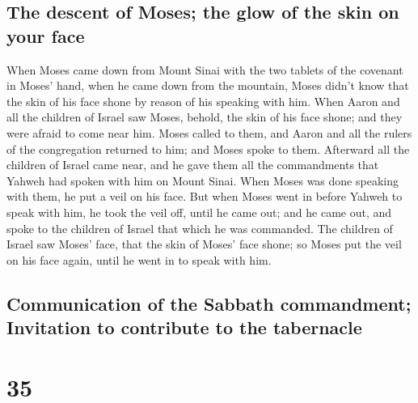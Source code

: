 \hypertarget{the-descent-of-moses-the-glow-of-the-skin-on-your-face}{%
\subsection{The descent of Moses; the glow of the skin on your
face}\label{the-descent-of-moses-the-glow-of-the-skin-on-your-face}}

 When Moses came down from Mount Sinai with the two
tablets of the covenant in Moses' hand, when he came down from the
mountain, Moses didn't know that the skin of his face shone by reason of
his speaking with him.  When Aaron and all the children
of Israel saw Moses, behold, the skin of his face shone; and they were
afraid to come near him.  Moses called to them, and Aaron
and all the rulers of the congregation returned to him; and Moses spoke
to them.  Afterward all the children of Israel came near,
and he gave them all the commandments that Yahweh had spoken with him on
Mount Sinai.  When Moses was done speaking with them, he
put a veil on his face.  But when Moses went in before
Yahweh to speak with him, he took the veil off, until he came out; and
he came out, and spoke to the children of Israel that which he was
commanded.  The children of Israel saw Moses' face, that
the skin of Moses' face shone; so Moses put the veil on his face again,
until he went in to speak with him.

\hypertarget{communication-of-the-sabbath-commandment-invitation-to-contribute-to-the-tabernacle}{%
\subsection{Communication of the Sabbath commandment; Invitation to
contribute to the
tabernacle}\label{communication-of-the-sabbath-commandment-invitation-to-contribute-to-the-tabernacle}}

\hypertarget{section-34}{%
\section{35}\label{section-34}}

